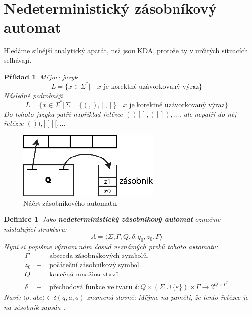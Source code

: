 \documentclass[10pt, a4paper, titlepage]{article}
\theoremstyle{note}
\newtheorem{definice}{Definice}
\newtheorem{priklad}{Příklad}
\begin{document}
\section{Nedeterministický zásobníkový automat}
Hledáme silnější analytický aparát, než jsou KDA, protože ty v určitých situacích selhávají.

\begin{priklad}
Mějme jazyk
$$L = \lbrace x \in \Sigma^{*}| \quad x \text{ je korektně uzávorkovaný výraz} \rbrace$$
Následně podrobněji
$$L = \lbrace x \in \Sigma^{*}| \Sigma = \lbrace (,),[,] \rbrace \quad x \text{ je korektně uzávorkovaný výraz} \rbrace$$
Do tohoto jazyka patří například řetězce $()[], ([]), \ldots$, ale nepatří do něj řetězce $()), ][][, \ldots$
\end{priklad}

\begin{figure}[ht]
\centering\includegraphics[width=7cm]{zasobnikovy.eps}
\caption{Náčrt zásobníkového automatu.}
\end{figure}

\begin{definice}
Jako \textbf{nedeterministický zásobníkový automat} označme následující strukturu:
$$
A = \langle \Sigma, \Gamma, Q, \delta, q_0, z_0, F \rangle
$$
Nyní si popišme význam nám dosud neznámých prvků tohoto automatu:
\begin{eqnarray*}
\Gamma &-& \text{ abeceda zásobnákových symbolů.} \\
z_0 &-& \text{ počáteční zásobníkový symbol.} \\
Q &-& \text{ konečná množina stavů.} \\
\delta &-& \text{ přechodová funkce ve tvaru } \delta : Q \times (\Sigma \cup \lbrace \varepsilon \rbrace) \times \Gamma \rightarrow 2^{Q \times \Gamma^{*}}
\end{eqnarray*}
Navíc $\langle \sigma, abc \rangle \in \delta(q, a, d)$ znamená slovně:  Mějme na paměti, že tento řetězec je na zásobník zapsán .
\end{definice}
\end{document}
